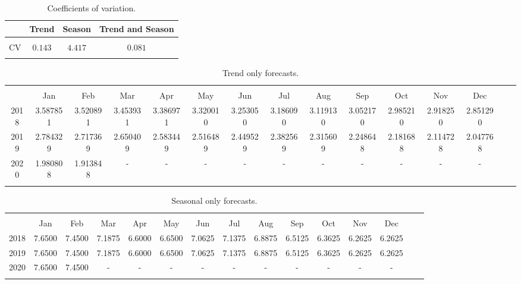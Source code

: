 \documentclass{article}
\begin{document}
\begin{table}[!htbp] \centering 
  \caption{Coefficients of variation.} 
  \label{} 
\begin{tabular}{@{\extracolsep{5pt}}cccc} 
& \textbf{Trend} & \textbf{Season} & \textbf{Trend and Season} \\ 
\hline \\[-1.8ex] 
CV & $0.143$ & $4.417$ & $0.081$  \\ 
\hline \\[-1.8ex] 
\end{tabular} 
\end{table}

\begin{table}[!htbp] \centering 
  \caption{Trend only forecasts.} 
  \label{} 
\begin{tabular}{@{\extracolsep{5pt}} ccccccccccccccc} 
\\[-1.8ex]\hline 
\hline \\[-1.8ex]          
& Jan & Feb & Mar & Apr & May & Jun & Jul & Aug & Sep & Oct & Nov & Dec \\                            
2018 & 3.587851 & 3.520891  & 3.453931 & 3.386971  & 3.320010 & 3.253050 & 3.186090 &  3.119130  & 3.052170& 2.985210  & 2.918250 & 2.851290 \\
2019 & 2.784329 & 2.717369 & 2.650409 & 2.583449  & 2.516489 & 2.449529 &  2.382569  & 2.315609 & 2.248648 & 2.181688  & 2.114728  & 2.047768 \\
2020 & 1.980808 & 1.913848 & - & - & - & - & - & - & - & - & - & - \\  
\hline \\[-1.8ex] 
\end{tabular} 
\end{table} 


\begin{table}[!htbp] \centering 
  \caption{Seasonal only forecasts.} 
  \label{} 
\begin{tabular}{@{\extracolsep{5pt}} ccccccccccccccc} 
\\[-1.8ex]\hline 
\hline \\[-1.8ex]          
& Jan & Feb & Mar & Apr & May & Jun & Jul & Aug & Sep & Oct & Nov & Dec \\                            
2018 & 7.6500  & 7.4500  & 7.1875  & 6.6000  & 6.6500  & 7.0625  & 7.1375  & 6.8875  & 6.5125  & 6.3625  & 6.2625 & 6.2625 \\
2019 & 7.6500 & 7.4500  & 7.1875  & 6.6000  & 6.6500  & 7.0625 & 7.1375 & 6.8875 &6.5125 & 6.3625  & 6.2625 & 6.2625  \\
2020 & 7.6500 & 7.4500  & - & - & - & - & - & - & - & - & - & - \\  
\hline \\[-1.8ex] 
\end{tabular} 
\end{table} 
\end{document}
